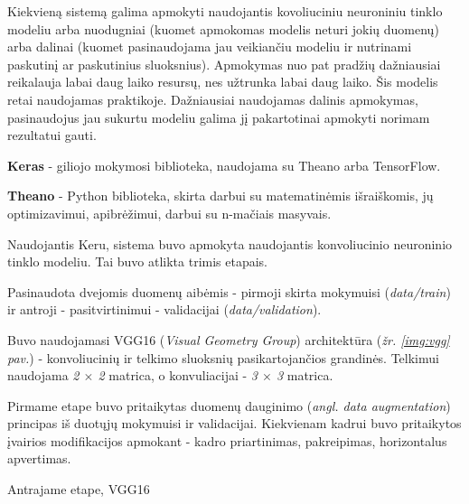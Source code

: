 \documentclass{VUMIFInfKursinis}
\begin{document}
Kiekvieną sistemą galima apmokyti naudojantis kovoliuciniu neuroniniu tinklo modeliu arba nuodugniai (kuomet apmokomas modelis neturi jokių duomenų) arba dalinai (kuomet pasinaudojama jau veikiančiu modeliu ir nutrinami paskutinį ar paskutinius sluoksnius). Apmokymas nuo pat pradžių dažniausiai reikalauja labai daug laiko resursų, nes užtrunka labai daug laiko. Šis modelis retai naudojamas praktikoje. Dažniausiai naudojamas dalinis apmokymas, pasinaudojus jau sukurtu modeliu galima jį pakartotinai apmokyti norimam rezultatui gauti. 

\textbf{Keras} - giliojo mokymosi biblioteka, naudojama su Theano arba TensorFlow.

\textbf{Theano} - Python biblioteka, skirta darbui su matematinėmis išraiškomis, jų optimizavimui, apibrėžimui, darbui su n-mačiais masyvais.


Naudojantis Keru, sistema buvo apmokyta naudojantis konvoliucinio neuroninio tinklo modeliu. Tai buvo atlikta trimis etapais.

Pasinaudota dvejomis duomenų aibėmis - pirmoji skirta mokymuisi (\textit{data/train}) ir antroji - pasitvirtinimui - validacijai (\textit{data/validation}).

Buvo naudojamasi VGG16 (\textit{Visual Geometry Group}) architektūra (\textit{žr. \ref{img:vgg} pav.}) - konvoliucinių ir telkimo sluoksnių pasikartojančios grandinės. Telkimui naudojama \textit{2 $\times$ 2} matrica, o konvuliacijai - \textit{3 $\times$ 3} matrica.

Pirmame etape buvo pritaikytas duomenų dauginimo (\textit{angl. data augmentation}) principas iš duotųjų mokymuisi ir validacijai. Kiekvienam kadrui buvo pritaikytos įvairios modifikacijos apmokant - kadro priartinimas, pakreipimas, horizontalus apvertimas.



Antrajame etape, VGG16 

\end{document}
